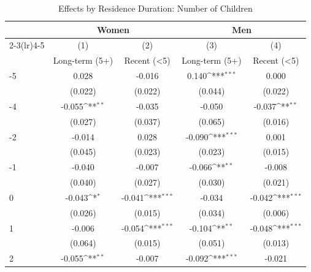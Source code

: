 \begin{table}[htbp]\centering
\def\sym#1{\ifmmode^{#1}\else\(^{#1}\)\fi}
\caption{Effects by Residence Duration: Number of Children}
\begin{tabular}{l*{4}{c}}
\hline\hline
            &\multicolumn{2}{c}{Women}                  &\multicolumn{2}{c}{Men}                    \\\cmidrule(lr){2-3}\cmidrule(lr){4-5}
            &\multicolumn{1}{c}{(1)}&\multicolumn{1}{c}{(2)}&\multicolumn{1}{c}{(3)}&\multicolumn{1}{c}{(4)}\\
            &\multicolumn{1}{c}{Long-term (5+)}&\multicolumn{1}{c}{Recent (<5)}&\multicolumn{1}{c}{Long-term (5+)}&\multicolumn{1}{c}{Recent (<5)}\\
\hline
-5          &       0.028         &      -0.016         &       0.140\sym{***}&       0.000         \\
            &     (0.022)         &     (0.022)         &     (0.044)         &     (0.022)         \\
[1em]
-4          &      -0.055\sym{**} &      -0.035         &      -0.050         &      -0.037\sym{**} \\
            &     (0.027)         &     (0.037)         &     (0.065)         &     (0.016)         \\
[1em]
-2          &      -0.014         &       0.028         &      -0.090\sym{***}&       0.001         \\
            &     (0.045)         &     (0.023)         &     (0.023)         &     (0.015)         \\
[1em]
-1          &      -0.040         &      -0.007         &      -0.066\sym{**} &      -0.008         \\
            &     (0.040)         &     (0.027)         &     (0.030)         &     (0.021)         \\
[1em]
0           &      -0.043\sym{*}  &      -0.041\sym{***}&      -0.034         &      -0.042\sym{***}\\
            &     (0.026)         &     (0.015)         &     (0.034)         &     (0.006)         \\
[1em]
1           &      -0.006         &      -0.054\sym{***}&      -0.104\sym{**} &      -0.048\sym{***}\\
            &     (0.064)         &     (0.015)         &     (0.051)         &     (0.013)         \\
[1em]
2           &      -0.055\sym{**} &      -0.007         &      -0.092\sym{***}&      -0.021         \\

\end{tabular}
\end{table}
